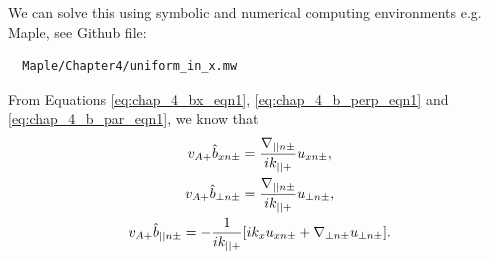 We can solve this using symbolic and numerical computing environments e.g. Maple, see Github file:
\begin{verbatim}
  Maple/Chapter4/uniform_in_x.mw
\end{verbatim} 
From Equations \eqref{eq:chap_4_bx_eqn1}, \eqref{eq:chap_4_b_perp_eqn1} and \eqref{eq:chap_4_b_par_eqn1}, we know that
\begin{gather}
    v_{A+}\hat{b}_{xn\pm} = \frac{\nabla_{||n\pm}}{ik_{||+}}u_{xn\pm}, \\
    v_{A+}\hat{b}_{\perp n\pm} = \frac{\nabla_{||n\pm}}{ik_{||+}}u_{\perp n\pm}, \\
    \label{eq:b_par_n_pm}
    v_{A+}\hat{b}_{|| n\pm} = -\frac{1}{ik_{||+}}\qty[ik_x u_{xn\pm}+\nabla_{\perp n\pm} u_{\perp n\pm}].
\end{gather}

